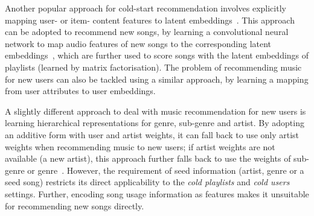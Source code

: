 Another popular approach for cold-start recommendation involves explicitly mapping 
user- or item- content features to latent embeddings~\cite{Gantner:2010}.
This approach can be adopted to recommend new songs, 
\eg by learning a convolutional neural network to map audio features of new songs to 
the corresponding latent embeddings~\cite{van2013deep},
which are further used to score songs with the latent embeddings of playlists (learned by matrix factorisation).
The problem of recommending music for new users can also be tackled using a similar approach, \eg
by learning a mapping from user attributes to user embeddings.

A slightly different approach to deal with music recommendation for new users is learning hierarchical 
representations for genre, sub-genre and artist.
By adopting an additive form with user and artist weights, it can fall back to use only artist weights
when recommending music to new users; if artist weights are not available (\eg a new artist), this approach 
further falls back to use the weights of sub-genre or genre~\cite{ben2017groove}.
However, the requirement of seed information (\eg artist, genre or a seed song) restricts its direct applicability to
the \emph{cold playlists} and \emph{cold users} settings. %
Further, encoding song usage information as features makes it unsuitable 
for recommending new songs directly.
%
%



